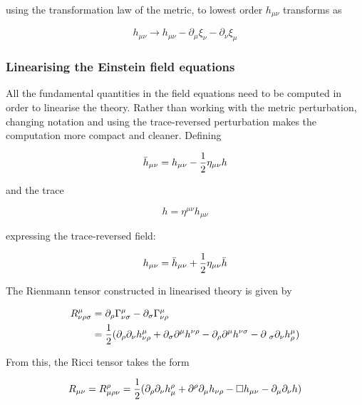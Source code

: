 \documentclass[binding=0.6cm, LaM]{sapthesis}
\begin{document}
	using the transformation law of the metric, to lowest order $h_{\mu\nu}$ transforms as
			
		\[
		h_{\mu\nu} \rightarrow h_{\mu\nu} - \partial_{\mu}\xi_{\nu} - \partial_{\nu}\xi_{\mu}
		\]


\subsubsection{Linearising the Einstein field equations}

	All the fundamental quantities in the field equations need to be computed in order to linearise the theory.
	Rather than working with the metric perturbation, changing notation and using the trace-reversed perturbation 
	makes the computation more compact and cleaner. Defining
	
		\begin{equation}
		{\bar h}_{\mu\nu} = h_{\mu\nu} - {1 \over {2}}\eta_{\mu\nu}h  
		\end{equation}

	and the trace
	
		\begin{equation}
		h = \eta^{\mu\nu}h_{\mu\nu}
		\end{equation}

	expressing the trace-reversed field:

		\begin{equation}
		h_{\mu\nu} = {\bar h}_{\mu\nu} + {1 \over {2}}\eta_{\mu\nu}{\bar h}
		\end{equation}

	The Rienmann tensor constructed in linearised theory is given by

		\begin{align}
		R^{\mu}_{\nu\rho\sigma} &= \partial_{\rho} \Gamma^{\mu}_{\nu\sigma} - \partial_{\sigma}\Gamma^{\mu}_{\nu\rho}  \\
				       &= {1 \over 2} (\partial_{\rho}\partial_{\nu}h^{\mu}_{\nu\rho} + \partial_{\sigma}\partial^{\mu}h^{\nu\rho} - \partial_{\rho}\partial^{\mu}h^{\nu\sigma} - \partial_{\					     \sigma}\partial_{\nu}h^{\mu}_{\rho})
		\end{align}

	From this, the Ricci tensor takes the form

		\begin{equation}
		R_{\mu\nu} = R^{\rho}_{\mu\rho\nu} = {1 \over 2}(\partial_{\rho}\partial_{\nu}h^{\rho}_{\mu} + \partial^{\rho}\partial_{\mu}h_{\nu\rho} - \square h_{\mu\nu} - \partial_{\mu}\partial_{\nu}h)
		\end{equation}
\end{document}
